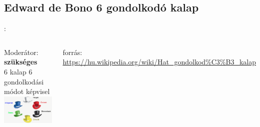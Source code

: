 \documentclass{beamer}
\begin{document}
\subsection{Edward de Bono 6 gondolkodó kalap}
\begin{frame}{\secname : \subsecname}
\begin{columns}
\centering
Moderátor: \textbf{szükséges} \\
\vspace{5mm}
6 kalap 6 gondolkodási módot képvisel
\centering
\includegraphics[scale=0.4]{figures/hatkalap.png}

\begin{footnotesize}
forrás: \url{https://hu.wikipedia.org/wiki/Hat_gondolkod\%C3\%B3_kalap}
\end{footnotesize}
\end{columns}
\end{frame}
\end{document}
